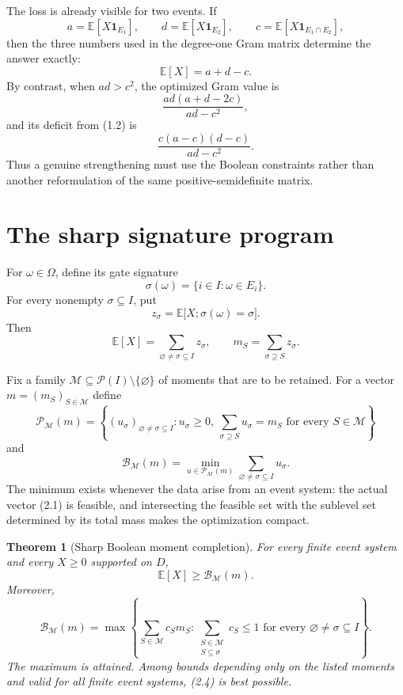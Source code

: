 \documentclass[11pt]{article}
\newtheorem{theorem}{Theorem}[section]
\theoremstyle{definition}
\theoremstyle{remark}
\newcommand{\E}{\mathbb E}
\newcommand{\one}{\mathbf 1}
\newcommand{\cP}{\mathcal P}
\newcommand{\cM}{\mathcal M}
\newcommand{\cB}{\mathcal B}
\begin{document}
The loss is already visible for two events.  If
\[
 a=\E[X\one_{E_1}],\qquad d=\E[X\one_{E_2}],\qquad
 c=\E[X\one_{E_1\cap E_2}],
\]
then the three numbers used in the degree-one Gram matrix determine the
answer exactly:
\[
 \E[X]=a+d-c.
 \tag{1.2}
\]
By contrast, when $ad>c^2$, the optimized Gram value is
\[
 \frac{ad(a+d-2c)}{ad-c^2},
\]
and its deficit from (1.2) is
\[
 \frac{c(a-c)(d-c)}{ad-c^2}.
 \tag{1.3}
\]
Thus a genuine strengthening must use the Boolean constraints rather than
another reformulation of the same positive-semidefinite matrix.

\section{The sharp signature program}

For $\omega\in\Omega$, define its gate signature
\[
 \sigma(\omega)=\{i\in I:\omega\in E_i\}.
\]
For every nonempty $\sigma\subseteq I$, put
\[
 z_\sigma=\E\bigl[X;\sigma(\omega)=\sigma\bigr].
 \tag{2.1}
\]
Then
\[
 \E[X]=\sum_{\varnothing\ne\sigma\subseteq I}z_\sigma,
 \qquad
 m_S=\sum_{\sigma\supseteq S}z_\sigma.
 \tag{2.2}
\]

Fix a family
\(
 \cM\subseteq\cP(I)\setminus\{\varnothing\}
\)
of moments that are to be retained.  For a vector
$m=(m_S)_{S\in\cM}$ define
\[
 \cP_{\cM}(m)=
 \left\{(u_\sigma)_{\varnothing\ne\sigma\subseteq I}:
 u_\sigma\geq0,
 \ \sum_{\sigma\supseteq S}u_\sigma=m_S
 \text{ for every }S\in\cM
 \right\}
\]
and
\[
 \cB_{\cM}(m)=
 \min_{u\in\cP_{\cM}(m)}
 \sum_{\varnothing\ne\sigma\subseteq I}u_\sigma.
 \tag{2.3}
\]
The minimum exists whenever the data arise from an event system: the
actual vector (2.1) is feasible, and intersecting the feasible set with the
sublevel set determined by its total mass makes the optimization compact.

\begin{theorem}[Sharp Boolean moment completion]\label{thm:signature}
For every finite event system and every $X\geq0$ supported on $D$,
\[
 \boxed{\E[X]\geq\cB_{\cM}(m).}
 \tag{2.4}
\]
Moreover,
\[
 \boxed{
 \cB_{\cM}(m)=
 \max\left\{
  \sum_{S\in\cM}c_Sm_S:
  \sum_{\substack{S\in\cM\\S\subseteq\sigma}}c_S\leq1
  \text{ for every }\varnothing\ne\sigma\subseteq I
 \right\}.}
 \tag{2.5}
\]
The maximum is attained.  Among bounds depending only on the listed
moments and valid for all finite event systems, (2.4) is best possible.
\end{theorem}
\end{document}
